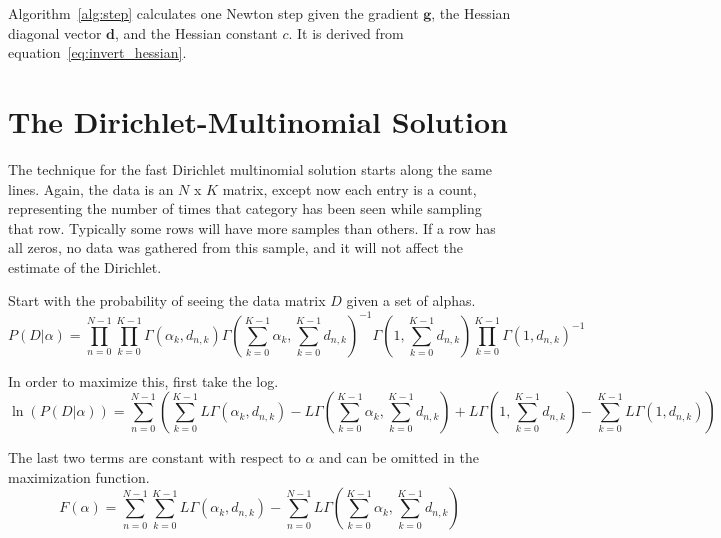 \documentclass[twoside]{article}
\begin{document}
Algorithm~\ref{alg:step} calculates one Newton step given the gradient $\mathbf{g}$, the Hessian diagonal vector $\mathbf{d}$, and the Hessian constant $c$.  It is derived from equation~\eqref{eq:invert_hessian}.

\section{The Dirichlet-Multinomial Solution}

The technique for the fast Dirichlet multinomial solution starts along the same lines.  Again, the data is an $N$ x $K$ matrix, except now each entry is a count, representing the number of times that category has been seen while sampling that row.  Typically some rows will have more samples than others.  If a row has all zeros, no data was gathered from this sample, and it will not affect the estimate of the Dirichlet.

Start with the probability of seeing the data matrix $D$ given a set of alphas.
\begin{equation}
P(D|\alpha)= \prod_{n=0}^{N-1}\prod_{k=0}^{K-1}\Gamma\left(\alpha_k,d_{n,k}\right)\Gamma\left(\sum_{k=0}^{K-1}\alpha_k,\sum_{k=0}^{K-1}d_{n,k}\right)^{-1} \Gamma\left(1,\sum_{k=0}^{K-1}d_{n,k}\right)\prod_{k=0}^{K-1}\Gamma\left(1,d_{n,k}\right)^{-1}
\end{equation}

In order to maximize this, first take the log.
\begin{equation}
\ln(P(D|\alpha))= \sum_{n=0}^{N-1}(\sum_{k=0}^{K-1}L\Gamma(\alpha_k,d_{n,k}) -L\Gamma(\sum_{k=0}^{K-1}\alpha_k,\sum_{k=0}^{K-1}d_{n,k})+ L\Gamma(1,\sum_{k=0}^{K-1}d_{n,k})-\sum_{k=0}^{K-1}L\Gamma(1,d_{n,k}))
\end{equation}

The last two terms are constant with respect to $\alpha$ and can be omitted in the maximization function.
\begin{equation} \label{eq:original_dmf}
F(\alpha)=\sum_{n=0}^{N-1}\sum_{k=0}^{K-1}L\Gamma(\alpha_k,d_{n,k})-
\sum_{n=0}^{N-1}L\Gamma(\sum_{k=0}^{K-1}\alpha_k,\sum_{k=0}^{K-1}d_{n,k})
\end{equation}
\end{document}
